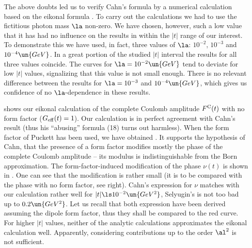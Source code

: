 The above doubts led us to verify Cahn's formula by a numerical calculation based on the eikonal formula . To carry out the calculations we had to use the fictitious photon mass $\la$ non-zero. We have chosen, however, such a low value that it has had no influence on the results in within the $|t|$ range of our interest. To demonstrate this we have used, in fact, three values of $\la$: $10^{-2}$, $10^{-3}$ and $10^{-4}\un{GeV}$. In a great portion of the studied $|t|$ interval the results for all three values coincide. The curves for $\la = 10^{-2} \un{GeV}$ tend to deviate for low $|t|$ values, signalizing that this value is not small enough. There is no relevant difference between the results for $\la = 10^{-3}$ and $10^{-4}\un{GeV}$, which gives us confidence of no $\la$-dependence in these results.

 shows our eikonal calculation of the complete Coulomb amplitude $F^{\rm C}(t)$ with no form factor ($G_{\rm eff}(t) = 1$). Our calculation is in perfect agreement with Cahn's result  (thus his ``abusing'' formula (18) turns out harmless). When the form factor of Puckett has been used, we have obtained . It supports the hypothesis of Cahn, that the presence of a form factor modifies mostly the phase of the complete Coulomb amplitude -- its modulus is indistinguishable from the Born approximation. The form-factor-induced modification of the phase $\nu(t)$ is shown in . One can see that the modification is rather small (it is to be compared with the phase with no form factor, see  right). Cahn's expression for $\nu$ matches with our calculation rather well for $|t| \ls 10^{-2}\un{GeV^2}$, Selyugin's is not too bad up to $0.2\un{GeV^2}$. Let us recall that both expression have been derived assuming the dipole form factor, thus they shall be compared to the red curve. For higher $|t|$ values, neither of the analytic calculations approximates the eikonal calculation well. Apparently, considering contributions up to the order $\al^2$ is not sufficient.


